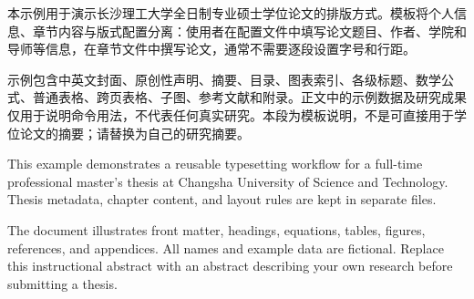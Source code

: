 \begin{cnabstract}
本示例用于演示长沙理工大学全日制专业硕士学位论文的排版方式。模板将个人信息、章节内容与版式配置分离：使用者在配置文件中填写论文题目、作者、学院和导师等信息，在章节文件中撰写论文，通常不需要逐段设置字号和行距。

示例包含中英文封面、原创性声明、摘要、目录、图表索引、各级标题、数学公式、普通表格、跨页表格、子图、参考文献和附录。正文中的示例数据及研究成果仅用于说明命令用法，不代表任何真实研究。本段为模板说明，不是可直接用于学位论文的摘要；请替换为自己的研究摘要。
\end{cnabstract}
\begin{enabstract}
This example demonstrates a reusable typesetting workflow for a full-time professional master's thesis at Changsha University of Science and Technology. Thesis metadata, chapter content, and layout rules are kept in separate files.

The document illustrates front matter, headings, equations, tables, figures, references, and appendices. All names and example data are fictional. Replace this instructional abstract with an abstract describing your own research before submitting a thesis.
\end{enabstract}
